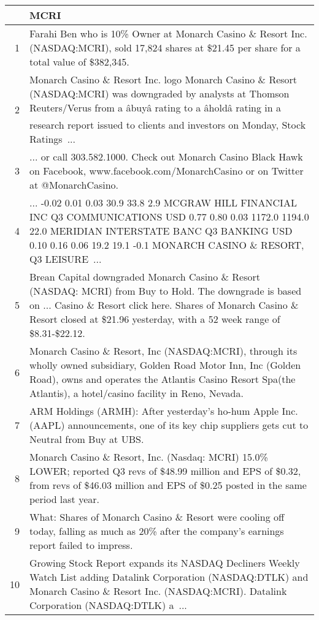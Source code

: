 \documentclass{tufte-handout}\usepackage[]{graphicx}\usepackage[]{color}
\begin{document}
\begin{tabularx}{\textwidth}{rX}
  \hline
 & MCRI \\ 
  \hline
1 &  Farahi Ben who is 10\% Owner at Monarch Casino \& Resort Inc. (NASDAQ:MCRI), sold 17,824 shares at \$21.45 per share for a total value of \$382,345.  \\ 
  2 &  Monarch Casino \& Resort Inc. logo Monarch Casino \& Resort (NASDAQ:MCRI) was downgraded by analysts at Thomson Reuters/Verus from a âbuyâ rating to a âholdâ rating in a research report issued to clients and investors on Monday, Stock Ratings ...  \\ 
  3 &  ... or call 303.582.1000. Check out Monarch Casino Black Hawk on Facebook, www.facebook.com/MonarchCasino or on Twitter at @MonarchCasino.  \\ 
  4 &  ... -0.02 0.01 0.03 30.9 33.8 2.9 MCGRAW HILL FINANCIAL INC Q3 COMMUNICATIONS USD 0.77 0.80 0.03 1172.0 1194.0 22.0 MERIDIAN INTERSTATE BANC Q3 BANKING USD 0.10 0.16 0.06 19.2 19.1 -0.1 MONARCH CASINO \& RESORT, Q3 LEISURE ...  \\ 
  5 &  Brean Capital downgraded Monarch Casino \& Resort (NASDAQ: MCRI) from Buy to Hold. The downgrade is based on ... Casino \& Resort click here. Shares of Monarch Casino \& Resort closed at \$21.96 yesterday, with a 52 week range of \$8.31-\$22.12.  \\ 
  6 &  Monarch Casino \& Resort, Inc (NASDAQ:MCRI), through its wholly owned subsidiary, Golden Road Motor Inn, Inc (Golden Road), owns and operates the Atlantis Casino Resort Spa(the Atlantis), a hotel/casino facility in Reno, Nevada.  \\ 
  7 &  ARM Holdings (ARMH): After yesterday's ho-hum Apple Inc. (AAPL) announcements, one of its key chip suppliers gets cut to Neutral from Buy at UBS.  \\ 
  8 &  Monarch Casino \& Resort, Inc. (Nasdaq: MCRI) 15.0\% LOWER; reported Q3 revs of \$48.99 million and EPS of \$0.32, from revs of \$46.03 million and EPS of \$0.25 posted in the same period last year.  \\ 
  9 &  What: Shares of Monarch Casino \& Resort were cooling off today, falling as much as 20\% after the company's earnings report failed to impress.  \\ 
  10 &  Growing Stock Report expands its NASDAQ Decliners Weekly Watch List adding Datalink Corporation (NASDAQ:DTLK) and Monarch Casino \& Resort Inc. (NASDAQ:MCRI). Datalink Corporation (NASDAQ:DTLK) a ...  \\ 
   \hline
\end{tabularx}
\end{document}
